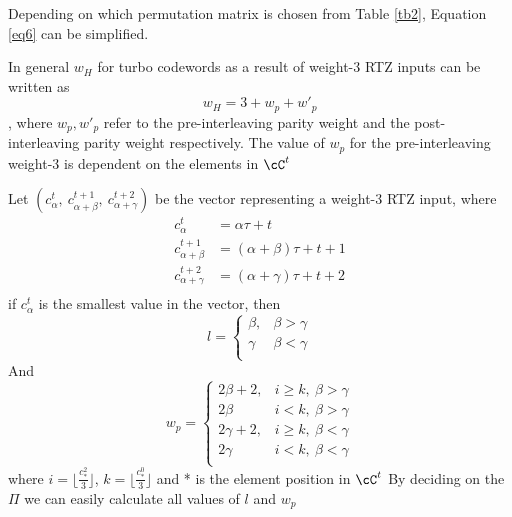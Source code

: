 \documentclass[11pt, oneside, dvipdfmx]{book}
\begin{document}
Depending on which permutation matrix is chosen from Table \ref{tb2}, Equation \ref{eq6} can be simplified. 

In general $w_H$ for turbo codewords as a result of weight-$3$ RTZ inputs can be written as $$w_H=3 + w_p+ w'_p$$, where $w_p,w'_p$ refer to the pre-interleaving parity weight and the post-interleaving parity weight respectively. The value of $w_p$ for the pre-interleaving weight-$3$ is dependent on the elements in $\cC^t$

Let $(c_{\alpha}^{t},~c_{\alpha+\beta}^{t+1},~c_{\alpha+\gamma}^{t+2})$ be the vector representing a weight-$3$ RTZ input, where 
\begin{equation}
\begin{split}
c_{\alpha}^{t}&=\alpha\tau+ t\\
c_{\alpha+\beta}^{t+1}&=(\alpha+\beta)\tau+ t+1\\
c_{\alpha+\gamma}^{t+2}&=(\alpha+\gamma)\tau+ t+2\\
\end{split}
\label{eq7}
\end{equation}
if $c_{\alpha}^{t}$ is the smallest value in the vector, then
\begin{equation}
l=
\begin{cases}
\beta ,& \beta>\gamma \\
\gamma & \beta < \gamma\\
\end{cases}
\label{eq8}
\end{equation}
And 
\begin{equation}
w_p=
\begin{cases}
2\beta+2,& i \geq k, ~\beta>\gamma \\
2\beta & i < k, ~\beta>\gamma\\
2\gamma+2,& i \geq k,~ \beta<\gamma \\
2\gamma & i < k, ~\beta<\gamma\\
\end{cases}
\label{eq9}
\end{equation}
where $i=\lfloor\frac{c_*^2}{3}\rfloor$, $k=\lfloor\frac{c_*^0}{3}\rfloor$ and * is the element position in $\cC^t$\newline
By deciding on the $\Pi$ we can easily calculate all values of $l$ and $w_p$
\end{document}
